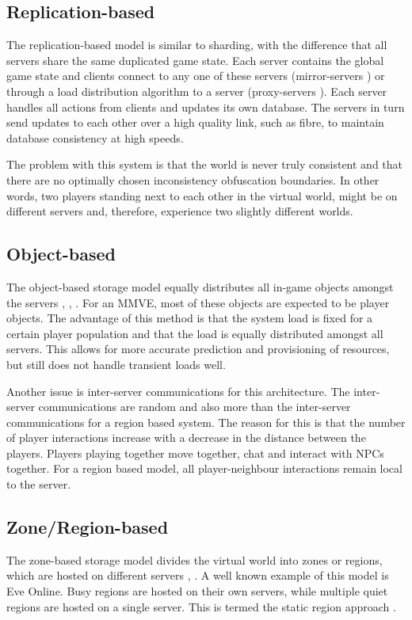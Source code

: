 \subsection{Replication-based}
The replication-based model is similar to sharding, with the difference that all servers share the same duplicated game state. Each server contains
the global game state and clients connect to any one of these servers (mirror-servers \cite{mirrored_server}) or through a load distribution
algorithm to a server (proxy-servers \cite{proxy_server_dist}). Each server handles all actions from clients and updates its own database. The
servers in turn send updates to each other over a high quality link, such as fibre, to maintain database consistency at high speeds.

The problem with this system is that the world is never truly consistent and that there are no optimally chosen inconsistency obfuscation boundaries.
In other words, two players standing next to each other in the virtual world, might be on different servers and, therefore, experience two slightly
different worlds.

\subsection{Object-based}
The object-based storage model equally distributes all in-game objects amongst the servers \cite{object_based_consistency1}, \cite{object_based_consistency2}, \cite{object_based_consistency3}. For an MMVE, most of these objects are expected to be player objects. The advantage of this method is that the system load is fixed for a certain player population and that the load is equally distributed amongst all servers. This allows for more accurate prediction and provisioning of resources, but still does not handle transient loads
well.

Another issue is inter-server communications for this architecture. The inter-server communications are random and also more than the inter-server
communications for a region based system. The reason for this is that the number of player interactions increase with a decrease in the distance
between the players. Players playing together move together, chat and interact with NPCs together. For a region based model, all player-neighbour
interactions remain local to the server.

\subsection{Zone/Region-based}
The zone-based storage model divides the virtual world into zones or regions, which are hosted on different
servers \cite{zone_based_stat}, \cite{zone_based_dyn}. A well known example of this model is Eve Online. Busy regions are hosted on their own
servers, while multiple quiet regions are hosted on a single server. This is termed the static region approach \cite{zone_based_stat}.


